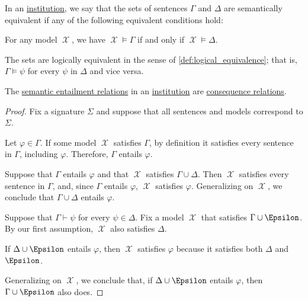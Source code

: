 \begin{definition}\label{def:semantic_equivalence}\mimprovised
  In an \hyperref[def:institution]{institution}, we say that the sets of sentences \( \Gamma \) and \( \Delta \) are semantically equivalent if any of the following equivalent conditions hold:
  \begin{thmenum}
     For any model \( \mscrX \), we have \( \mscrX \vDash \Gamma \) if and only if \( \mscrX \vDash \Delta \).

     The sets are logically equivalent in the sense of \cref{def:logical_equivalence}; that is, \( \Gamma \vDash \psi \) for every \( \psi \) in \( \Delta \) and vice versa.
  \end{thmenum}
\end{definition}

\begin{proposition}\label{thm:derivability_relations_are_consequence}
  The \hyperref[def:institutional_entailment]{semantic entailment relations} in an \hyperref[def:institution]{institution} are \hyperref[def:consequence_relation]{consequence relations}.
\end{proposition}
\begin{proof}
  Fix a signature \( \Sigma \) and suppose that all sentences and models correspond to \( \Sigma \).

   Let \( \varphi \in \Gamma \). If some model \( \mscrX \) satisfies \( \Gamma \), by definition it satisfies every sentence in \( \Gamma \), including \( \varphi \). Therefore, \( \Gamma \) entails \( \varphi \).

   Suppose that \( \Gamma \) entails \( \varphi \) and that \( \mscrX \) satisfies \( \Gamma \cup \Delta \). Then \( \mscrX \) satisfies every sentence in \( \Gamma \), and, since \( \Gamma \) entails \( \varphi \), \( \mscrX \) satisfies \( \varphi \). Generalizing on \( \mscrX \), we conclude that \( \Gamma \cup \Delta \) entails \( \varphi \).

   Suppose that \( \Gamma \vdash \psi \) for every \( \psi \in \Delta \). Fix a model \( \mscrX \) that satisfies \( \Gamma \cup \Epsilon \). By our first assumption, \( \mscrX \) also satisfies \( \Delta \).

  If \( \Delta \cup \Epsilon \) entails \( \varphi \), then \( \mscrX \) satisfies \( \varphi \) because it satisfies both \( \Delta \) and \( \Epsilon \).

  Generalizing on \( \mscrX \), we conclude that, if \( \Delta \cup \Epsilon \) entails \( \varphi \), then \( \Gamma \cup \Epsilon \) also does.
\end{proof}

